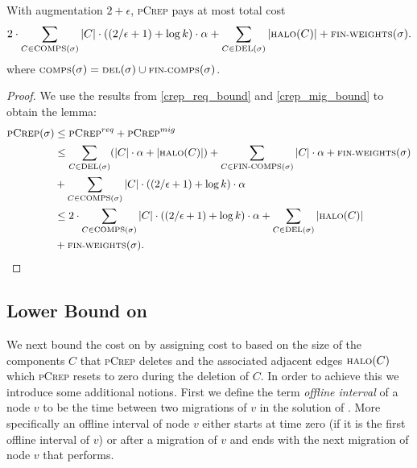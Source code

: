 \documentclass[a4paper,UKenglish,cleveref, autoref, thm-restate,authorcolumns]{lipics-v2019}
\newcommand{\nl}{\newline}
\newcommand{\adjDel}{\textsc{pCrep}}
\newcommand{\del}{\text{\scriptsize DEL}}
\newcommand{\opt}{\text{O{\scriptsize PT}}}
\newcommand{\halo}{\text{\scriptsize HALO}}
\newcommand{\finalComps}{\text{\scriptsize FIN-COMPS}}
\newcommand{\finalWeights}{\text{\scriptsize FIN-WEIGHTS}}
\newcommand{\comps}{\text{\scriptsize COMPS}}
\begin{document}
\begin{lemma}
	\label{crep_upper_bound}
	With augmentation $2+\epsilon$, \adjDel{} pays at most total cost\nl
	\begin{align*}
	2\cdot\sum_{C\in\comps(\sigma)}|C|\cdot((2/\epsilon+1)+\log k)\cdot\alpha+\sum_{C\in\del{}(\sigma)}|\halo(C)|+\finalWeights(\sigma).
	\end{align*}
	where $\comps(\sigma)=\del{}(\sigma)\cup\finalComps(\sigma)$.
\end{lemma}

\begin{proof}
	We use the results from \cref{crep_req_bound} and \cref{crep_mig_bound} to obtain the lemma:
	\begin{align*}
	\adjDel(\sigma) & \leq \adjDel^{req} + \adjDel^{mig}\\
	& \leq \sum_{C\in\del{}(\sigma)}(|C|\cdot\alpha+|\halo(C)|)+\sum_{C\in \finalComps(\sigma)}|C|\cdot\alpha+\finalWeights(\sigma)\\ &+\sum_{C\in\comps(\sigma)}|C|\cdot((2/\epsilon+1)+\log k)\cdot\alpha\\
	&\leq 2\cdot\sum_{C\in\comps(\sigma)}|C|\cdot((2/\epsilon+1)+\log k)\cdot\alpha+\sum_{C\in\del{}(\sigma)}|\halo(C)|\\
	&+\finalWeights(\sigma).
	\end{align*}
\end{proof}

\subsection{Lower Bound on \opt{}}

We next bound the cost on \opt{} by assigning cost to \opt{} based on the size of the components $C$ that \adjDel{} deletes and the associated adjacent edges $\halo(C)$ which \adjDel{} resets to zero during the deletion of $C$. In order to achieve this we introduce some additional notions.
First we define the term \textit{offline interval} of a node $v$ to be the time between two migrations of $v$ in the solution of \opt{}. More specifically an offline interval of node $v$ either starts at time zero (if it is the first offline interval of $v$) or after a migration of $v$ and ends with the next migration of node $v$ that \opt{} performs.
\end{document}
